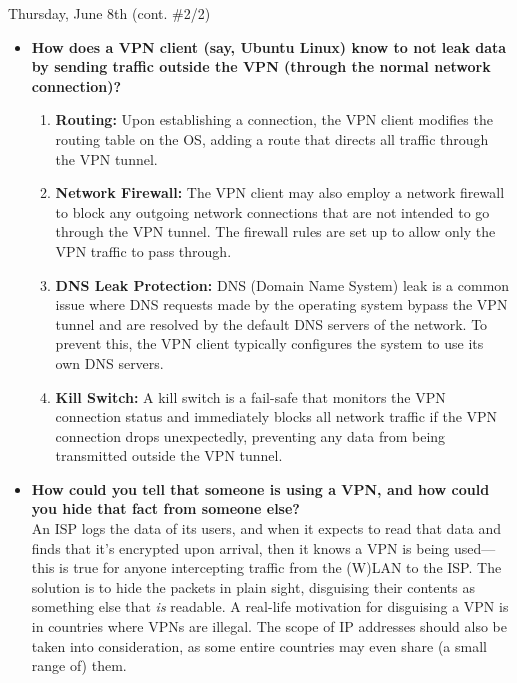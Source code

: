\documentclass[11pt]{article}
\begin{document}
\begin{orangebox}{Thursday, June 8th \hspace{0.2cm}(cont. \#2/2)\vspace{-2.2em}\begin{flushright}\end{flushright}}
    \begin{itemize}
        \item\textbf{How does a VPN client (say, Ubuntu Linux) know to not leak data by sending traffic outside the VPN (through the normal network connection)?}
        \begin{enumerate}
            \item\textbf{Routing:} Upon establishing a connection, the VPN client modifies the routing table on the OS, adding a route that directs all traffic through the VPN tunnel.
            \item\textbf{Network Firewall:} The VPN client may also employ a network firewall to block any outgoing network connections that are not intended to go through the VPN tunnel. The firewall rules are set up to allow only the VPN traffic to pass through.
            \item\textbf{DNS Leak Protection:} DNS (Domain Name System) leak is a common issue where DNS requests made by the operating system bypass the VPN tunnel and are resolved by the default DNS servers of the network. To prevent this, the VPN client typically configures the system to use its own DNS servers.
            \item\textbf{Kill Switch:} A kill switch is a fail-safe that monitors the VPN connection status and immediately blocks all network traffic if the VPN connection drops unexpectedly, preventing any data from being transmitted outside the VPN tunnel.
        \end{enumerate}
        \item\textbf{How could you tell that someone is using a VPN, and how could you hide that fact from someone else?} \\
        \phantom{~~~~} An ISP logs the data of its users, and when it expects to read that data and finds that it's encrypted upon arrival, then it knows a VPN is being used---this is true for anyone intercepting traffic from the (W)LAN to the ISP. The solution is to hide the packets in plain sight, disguising their contents as something else that \textit{is} readable. A real-life motivation for disguising a VPN is in countries where VPNs are illegal. The scope of IP addresses should also be taken into consideration, as some entire countries may even share (a small range of) them.

\end{itemize}
\end{orangebox}
\end{document}
